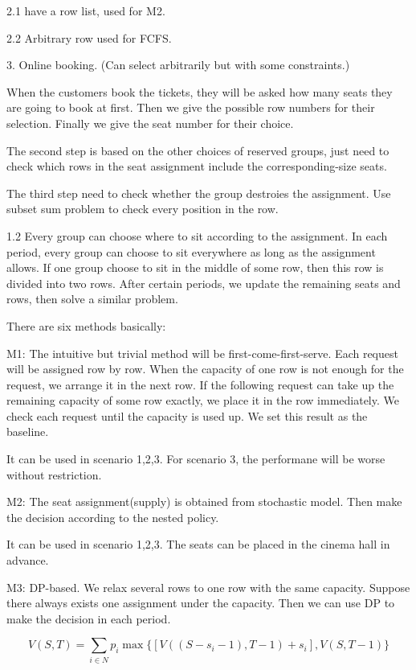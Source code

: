 2.1 have a row list, used for M2.

2.2 Arbitrary row used for FCFS.

3. Online booking. (Can select arbitrarily but with some constraints.)

When the customers book the tickets, they will be asked how many seats they are going to book at first. Then we give the possible row numbers for their selection. Finally we give the seat number for their choice.

The second step is based on the other choices of reserved groups, just need to check which rows in the seat assignment include the corresponding-size seats.

The third step need to check whether the group destroies the assignment. Use subset sum problem to check every position in the row.

1.2 Every group can choose where to sit according to the assignment.
In each period, every group can choose to sit everywhere as long as the assignment allows. If one group choose to sit in the middle of some row, then this row is divided into two rows. 
After certain periods, we update the remaining seats and rows, then solve a similar problem.


There are six methods basically:

M1:
The intuitive but trivial method will be first-come-first-serve. Each request will be assigned row by row. When the capacity of one row is not enough for the request, we arrange it in the next row. If the following request can take up the remaining capacity of some row exactly, we place it in the row immediately. We check each request until the capacity is used up. We set this result as the baseline.

It can be used in scenario 1,2,3. For scenario 3, the performane will be worse without restriction.


M2: The seat assignment(supply) is obtained from stochastic model. Then make the decision according to the nested policy.

It can be used in scenario 1,2,3. The seats can be placed in the cinema hall in advance.

M3: DP-based. We relax several rows to one row with the same capacity. Suppose there always exists one assignment under the capacity. Then we can use DP to make the decision in each period.

$$V(S,T) = \sum_{i \in N} p_i \max\{ {[V((S-s_i-1),T-1)+ s_i]}, {V(S,T-1)}\}$$

